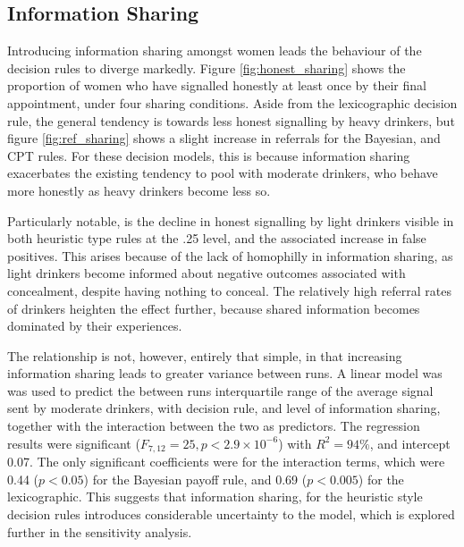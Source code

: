 \subsection{Information Sharing}
\label{sub:sharing_results}

Introducing information sharing amongst women leads the behaviour of the decision rules to diverge markedly. Figure \ref{fig:honest_sharing} shows the proportion of women who have signalled honestly at least once by their final appointment, under four sharing conditions. Aside from the lexicographic decision rule, the general tendency is towards less honest signalling by heavy drinkers, but figure \ref{fig:ref_sharing} shows a slight increase in referrals for the Bayesian, and \ac{CPT} rules. For these decision models, this is because information sharing exacerbates the existing tendency to pool with moderate drinkers, who behave more honestly as heavy drinkers become less so.

Particularly notable, is the decline in honest signalling by light drinkers visible in both heuristic type rules at the .25 level, and the associated increase in false positives. This arises because of the lack of homophilly in information sharing, as light drinkers become informed about negative outcomes associated with concealment, despite having nothing to conceal. The relatively high referral rates of drinkers heighten the effect further, because shared information becomes dominated by their experiences. 

The relationship is not, however, entirely that simple, in that increasing information sharing leads to greater variance between runs. A linear model was was used to predict the between runs interquartile range of the average signal sent by moderate drinkers, with decision rule, and level of information sharing, together with the interaction between the two as predictors. The regression results were significant (\(F_{7,12}=25,p<2.9\times10^{-6}\)) with \(R^2=94\%\), and intercept 0.07. The only significant coefficients were for the interaction terms, which were 0.44 (\(p<0.05\)) for the Bayesian payoff rule, and 0.69 (\(p<0.005\)) for the lexicographic. This suggests that information sharing, for the heuristic style decision rules introduces considerable uncertainty to the model, which is explored further in the sensitivity analysis.

